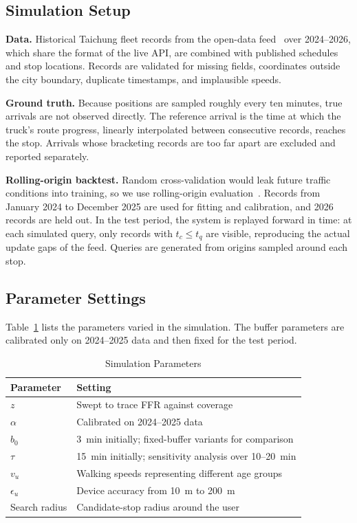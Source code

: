 \subsection{Simulation Setup}
\textbf{Data.} Historical Taichung fleet records from the open-data feed~\cite{taichung_fleet_api} over 2024--2026, which share the format of the live API, are combined with published schedules and stop locations. Records are validated for missing fields, coordinates outside the city boundary, duplicate timestamps, and implausible speeds.

\textbf{Ground truth.} Because positions are sampled roughly every ten minutes, true arrivals are not observed directly. The reference arrival is the time at which the truck's route progress, linearly interpolated between consecutive records, reaches the stop. Arrivals whose bracketing records are too far apart are excluded and reported separately.

\textbf{Rolling-origin backtest.} Random cross-validation would leak future traffic conditions into training, so we use rolling-origin evaluation~\cite{tashman2000,hyndman2021}. Records from January 2024 to December 2025 are used for fitting and calibration, and 2026 records are held out. In the test period, the system is replayed forward in time: at each simulated query, only records with $t_c \le t_q$ are visible, reproducing the actual update gaps of the feed. Queries are generated from origins sampled around each stop.

\subsection{Parameter Settings}
Table~\ref{tab:params} lists the parameters varied in the simulation. The buffer parameters are calibrated only on 2024--2025 data and then fixed for the test period.

\begin{table}[t]
\caption{Simulation Parameters}
\label{tab:params}
\centering
\footnotesize
\begin{tabular}{@{}lp{}@{}}
\toprule
Parameter & Setting \\
\midrule
$z$ & Swept to trace FFR against coverage \\
$\alpha$ & Calibrated on 2024--2025 data \\
$b_0$ & 3~min initially; fixed-buffer variants for comparison \\
$\tau$ & 15~min initially; sensitivity analysis over 10--20~min \\
$v_u$ & Walking speeds representing different age groups~\cite{knoblauch1996} \\
$\epsilon_u$ & Device accuracy from 10~m to 200~m \\
Search radius & Candidate-stop radius around the user \\
\bottomrule
\end{tabular}
\end{table}

